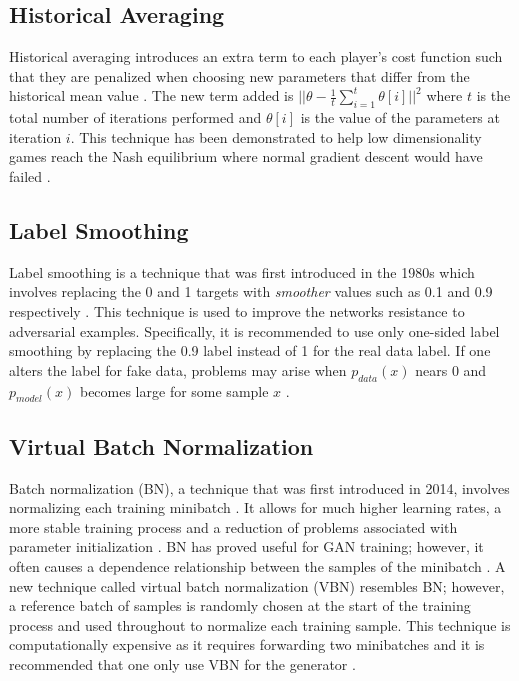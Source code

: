 \documentclass[11pt]{article}
\begin{document}
\subsection{Historical Averaging}
Historical averaging introduces an extra term to each player's cost function such that they are penalized when choosing new parameters that differ from the historical mean value \citep{2016arXiv160603498S}. The new term added is $||\theta - \frac{1}{t}\sum_{i=1}^{t}\theta[i]||^2$ where $t$ is the total number of iterations performed and $\theta[i]$ is the value of the parameters at iteration $i$. This technique has been demonstrated to help low dimensionality games reach the Nash equilibrium where normal gradient descent would have failed \citep{2016arXiv160603498S}.

\subsection{Label Smoothing}
Label smoothing is a technique that was first introduced in the 1980s which involves replacing the 0 and 1 targets with \textit{smoother} values such as 0.1 and 0.9 respectively \citep{2016arXiv160603498S}. This technique is used to improve the networks resistance to adversarial examples. Specifically, it is recommended to use only one-sided label smoothing by replacing the 0.9 label instead of 1 for the real data label. If one alters the label for fake data, problems may arise when $p_{data}(x)$ nears $0$ and $p_{model}(x)$ becomes large for some sample $x$ \citep{2016arXiv160603498S}.

\subsection{Virtual Batch Normalization}
Batch normalization (BN), a technique that was first introduced in 2014, involves normalizing each training minibatch \citep{2015arXiv150203167I}. It allows for much higher learning rates, a more stable training process and a reduction of problems associated with parameter initialization \citep{2015arXiv150203167I}. BN has proved useful for GAN training; however, it often causes a dependence relationship between the samples of the minibatch \citep{2016arXiv160603498S}. A new technique called virtual batch normalization (VBN) resembles BN; however, a reference batch of samples is randomly chosen at the start of the training process and used throughout to normalize each training sample. This technique is computationally expensive as it requires forwarding two minibatches and it is recommended that one only use VBN for the generator \citep{2016arXiv160603498S}.
\end{document}
